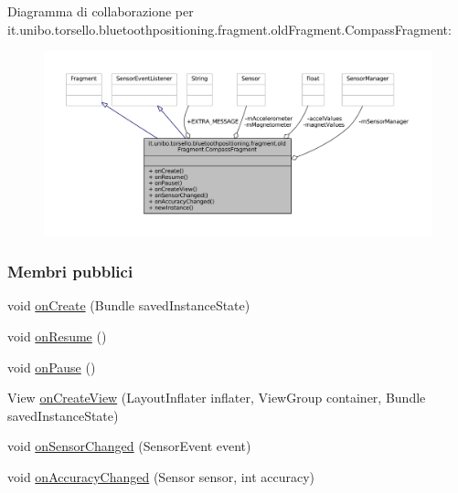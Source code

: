 Diagramma di collaborazione per it.\+unibo.\+torsello.\+bluetoothpositioning.\+fragment.\+old\+Fragment.\+Compass\+Fragment\+:
\nopagebreak
\begin{figure}[H]
\begin{center}
\leavevmode
\includegraphics[width=350pt]{classit_1_1unibo_1_1torsello_1_1bluetoothpositioning_1_1fragment_1_1oldFragment_1_1CompassFragment__coll__graph}
\end{center}
\end{figure}
\subsubsection*{Membri pubblici}
\begin{DoxyCompactItemize}
\item 
void \hyperlink{classit_1_1unibo_1_1torsello_1_1bluetoothpositioning_1_1fragment_1_1oldFragment_1_1CompassFragment_aa5fc14a2e767999f225aa4d4b2bff424_aa5fc14a2e767999f225aa4d4b2bff424}{on\+Create} (Bundle saved\+Instance\+State)
\item 
void \hyperlink{classit_1_1unibo_1_1torsello_1_1bluetoothpositioning_1_1fragment_1_1oldFragment_1_1CompassFragment_a32aa07ca1beb0091037267d8d56b9bb2_a32aa07ca1beb0091037267d8d56b9bb2}{on\+Resume} ()
\item 
void \hyperlink{classit_1_1unibo_1_1torsello_1_1bluetoothpositioning_1_1fragment_1_1oldFragment_1_1CompassFragment_a7f6236f3d95a9279e0c58e88aa2401ed_a7f6236f3d95a9279e0c58e88aa2401ed}{on\+Pause} ()
\item 
View \hyperlink{classit_1_1unibo_1_1torsello_1_1bluetoothpositioning_1_1fragment_1_1oldFragment_1_1CompassFragment_ad0f88e0af547fa37b29081074023effb_ad0f88e0af547fa37b29081074023effb}{on\+Create\+View} (Layout\+Inflater inflater, View\+Group container, Bundle saved\+Instance\+State)
\item 
void \hyperlink{classit_1_1unibo_1_1torsello_1_1bluetoothpositioning_1_1fragment_1_1oldFragment_1_1CompassFragment_aadc7f58d3eae6662db5b5ad05a6fd760_aadc7f58d3eae6662db5b5ad05a6fd760}{on\+Sensor\+Changed} (Sensor\+Event event)
\item 
void \hyperlink{classit_1_1unibo_1_1torsello_1_1bluetoothpositioning_1_1fragment_1_1oldFragment_1_1CompassFragment_a72278751498e147f3d18234c884b0490_a72278751498e147f3d18234c884b0490}{on\+Accuracy\+Changed} (Sensor sensor, int accuracy)
\end{DoxyCompactItemize}
